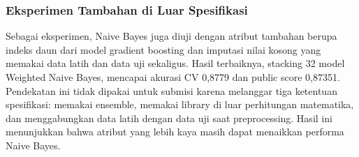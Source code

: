\subsubsection{Eksperimen Tambahan di Luar Spesifikasi}
Sebagai eksperimen, Naive Bayes juga diuji dengan atribut tambahan berupa indeks
daun dari model gradient boosting dan imputasi nilai kosong yang memakai data latih
dan data uji sekaligus. Hasil terbaiknya, stacking 32 model Weighted Naive Bayes,
mencapai akurasi CV 0,8779 dan public score 0,87351. Pendekatan ini tidak dipakai
untuk submisi karena melanggar tiga ketentuan spesifikasi: memakai ensemble,
memakai library di luar perhitungan matematika, dan menggabungkan data latih dengan
data uji saat preprocessing. Hasil ini menunjukkan bahwa atribut yang lebih kaya
masih dapat menaikkan performa Naive Bayes.
\fussy
